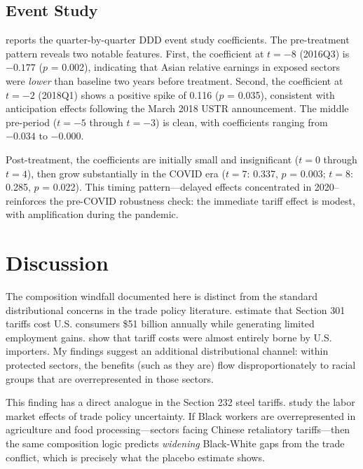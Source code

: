 \documentclass[12pt]{article}
\begin{document}
\subsection{Event Study}



 reports the quarter-by-quarter DDD event study coefficients. The pre-treatment pattern reveals two notable features. First, the coefficient at $t = -8$ (2016Q3) is $-0.177$ ($p$ = 0.002), indicating that Asian relative earnings in exposed sectors were \textit{lower} than baseline two years before treatment. Second, the coefficient at $t = -2$ (2018Q1) shows a positive spike of 0.116 ($p$ = 0.035), consistent with anticipation effects following the March 2018 USTR announcement. The middle pre-period ($t = -5$ through $t = -3$) is clean, with coefficients ranging from $-0.034$ to $-0.000$.

Post-treatment, the coefficients are initially small and insignificant ($t = 0$ through $t = 4$), then grow substantially in the COVID era ($t = 7$: 0.337, $p$ = 0.003; $t = 8$: 0.285, $p$ = 0.022). This timing pattern---delayed effects concentrated in 2020--reinforces the pre-COVID robustness check: the immediate tariff effect is modest, with amplification during the pandemic.

\section{Discussion}

The composition windfall documented here is distinct from the standard distributional concerns in the trade policy literature. \citet{fajgelbaum2020return} estimate that Section 301 tariffs cost U.S. consumers \$51 billion annually while generating limited employment gains. \citet{amiti2019impact} show that tariff costs were almost entirely borne by U.S. importers. My findings suggest an additional distributional channel: within protected sectors, the benefits (such as they are) flow disproportionately to racial groups that are overrepresented in those sectors.

This finding has a direct analogue in the Section 232 steel tariffs. \citet{handley2020rising} study the labor market effects of trade policy uncertainty. If Black workers are overrepresented in agriculture and food processing---sectors facing Chinese retaliatory tariffs---then the same composition logic predicts \textit{widening} Black-White gaps from the trade conflict, which is precisely what the placebo estimate shows.
\end{document}
